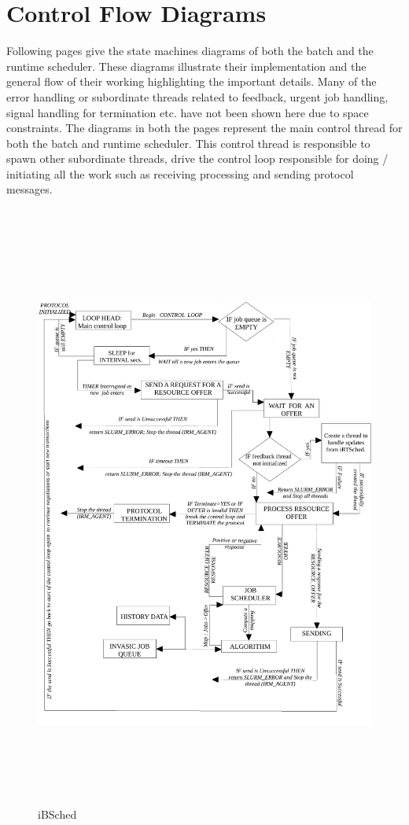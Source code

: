 \section{Control Flow Diagrams}
Following pages give the state machines diagrams of both the batch and the runtime scheduler. These diagrams illustrate their implementation and the general flow of their working highlighting the important details. Many of the error handling or subordinate threads related to feedback, urgent job handling, signal handling for termination etc. have not been shown here due to space constraints. The diagrams in both the pages represent the main control thread for both the batch and runtime scheduler. This control thread is responsible to spawn other subordinate threads, drive the control loop responsible for doing / initiating all the work such as receiving processing and sending protocol messages.\\ \\
\begin{figure}[!htbp]
\hspace*{0.1in}
\centering
\includegraphics[width=1.0\textwidth, height=195mm]{./figures/iBSched.pdf}
\caption{iBSched}
\label{fig:Neg}
\end{figure}
